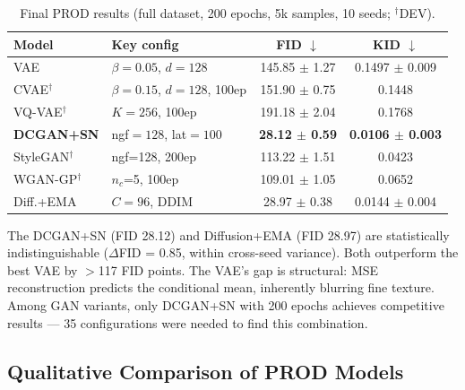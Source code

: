 \documentclass[runningheads]{llncs}
\begin{document}
\begin{table}[htbp]
\caption{Final PROD results (full dataset, 200 epochs, 5k samples, 10 seeds; $^\dagger$DEV).}\label{tab:main}
\centering
\begin{tabular}{llcc}
\toprule
Model & Key config & FID $\downarrow$ & KID $\downarrow$ \\
\midrule
VAE & $\beta{=}0.05$, $d{=}128$ & 145.85 $\pm$ 1.27 & 0.1497 $\pm$ 0.009 \\
CVAE$^\dagger$ & $\beta{=}0.15$, $d{=}128$, 100ep & 151.90 $\pm$ 0.75 & 0.1448 \\
VQ-VAE$^\dagger$ & $K{=}256$, 100ep & 191.18 $\pm$ 2.04 & 0.1768 \\
\midrule
\textbf{DCGAN+SN} & ngf${=}128$, lat${=}100$ & \textbf{28.12 $\pm$ 0.59} & \textbf{0.0106 $\pm$ 0.003} \\
StyleGAN$^\dagger$ & ngf=128, 200ep & 113.22 $\pm$ 1.51 & 0.0423 \\
WGAN-GP$^\dagger$ & $n_c$=5, 100ep & 109.01 $\pm$ 1.05 & 0.0652 \\
\midrule
Diff.+EMA & $C{=}96$, DDIM & 28.97 $\pm$ 0.38 & 0.0144 $\pm$ 0.004 \\
\bottomrule
\end{tabular}
\end{table}

The DCGAN+SN (FID 28.12) and Diffusion+EMA (FID 28.97) are statistically indistinguishable ($\Delta$FID = 0.85, within cross-seed variance). Both outperform the best VAE by $>$117 FID points. The VAE's gap is structural: MSE reconstruction predicts the conditional mean, inherently blurring fine texture. Among GAN variants, only DCGAN+SN with 200 epochs achieves competitive results --- 35 configurations were needed to find this combination.

\subsection{Qualitative Comparison of PROD Models}\label{sec:qualitative}

\end{document}
